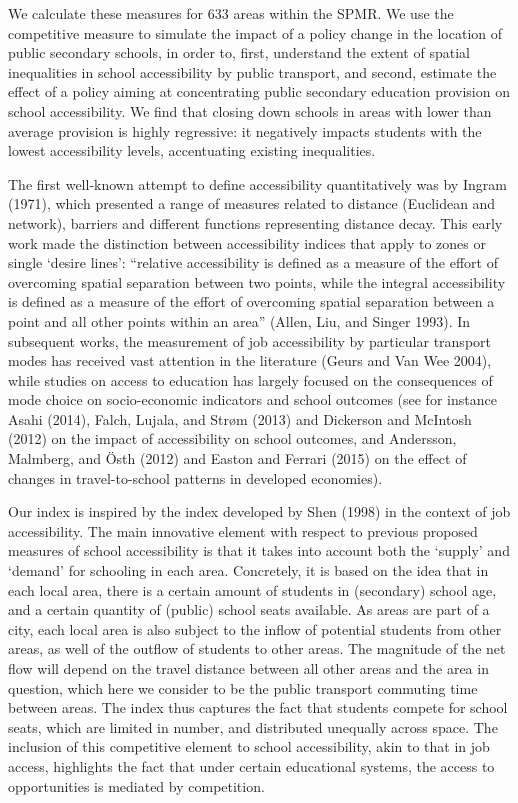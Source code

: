 \documentclass[3p,authoryear,preprint,review,12pt]{elsarticle}
\begin{document}
We calculate these measures for 633 areas within the SPMR. We use the competitive measure to simulate the impact of a policy change in the location of public secondary schools, in order to, first, understand the extent of spatial inequalities in school accessibility by public transport, and second, estimate the
effect of a policy aiming at concentrating public secondary education provision on school accessibility. We find that closing down schools in areas with lower than average provision is highly regressive: it
negatively impacts students with the lowest accessibility levels,
accentuating existing inequalities.

The first well-known attempt to define accessibility quantitatively was by Ingram (1971), which presented a range of measures related to
distance (Euclidean and network), barriers and different functions
representing distance decay. This early work made the distinction
between accessibility indices that apply to zones or single `desire
lines': ``relative accessibility is defined as a measure of the effort of overcoming spatial separation between two points, while the integral accessibility is defined as a measure of the effort of overcoming spatial separation between a point and all other points within an area'' (Allen, Liu, and Singer 1993). In subsequent works, the measurement of job accessibility by particular transport modes has received vast attention in the literature (Geurs and Van Wee 2004), while studies on access to education has largely focused on the consequences of mode choice on socio-economic indicators and school outcomes (see for instance Asahi (2014), Falch, Lujala, and Str{ø}m (2013) and Dickerson and McIntosh (2012) on the impact of accessibility on school outcomes, and Andersson, Malmberg, and {Ö}sth (2012) and Easton and Ferrari (2015) on the effect of changes in travel-to-school patterns in developed economies).

Our index is inspired by the index developed by Shen (1998) in the
context of job accessibility. The main innovative element with respect to previous proposed measures of school accessibility is that it takes into account both the `supply' and `demand' for schooling in each area. Concretely, it is based on the idea that in each local area, there is a certain amount of students in (secondary) school age, and a certain quantity of (public) school seats available. As areas are part of a city, each local area is also subject to the inflow of potential students from other areas, as well of the outflow of students to other areas. The magnitude of the net flow will depend on the travel distance between all other areas and the area in question, which here we consider to be the public transport commuting time between areas. The index thus
captures the fact that students compete for school seats, which are
limited in number, and distributed unequally across space. The inclusion of this competitive element to school accessibility, akin to that in job access, highlights the fact that under certain educational systems, the access to opportunities is mediated by competition.
\end{document}
